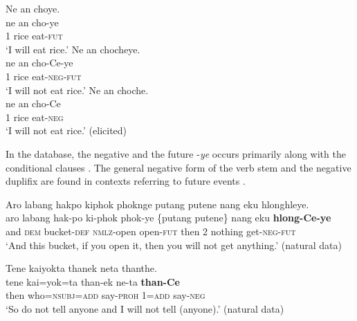 \documentclass[output=paper,colorlinks,citecolor=brown]{langscibook}
\begin{document}
\ea\label{ex:amr:3} 
    \ea\label{ex:amr:3a}Ne an choye.  \\
        \gll  ne an cho-ye \\
              1 rice eat-\textsc{fut} \\
        \glt ‘I will eat rice.’ 
    \ex\label{ex:amr:3b}Ne an chocheye. \\
        \gll  ne an cho-Ce-ye \\
              1 rice eat-\textsc{neg}{}-\textsc{fut} \\
        \glt ‘I will not eat rice.’ 
    \ex\label{ex:amr:3c} Ne an choche. \\
        \gll ne an cho-Ce\\
              1 rice eat-\textsc{neg} \\
        \glt ‘I will not eat rice.’ (elicited)
    \z
\z 

In the database, the negative and the future -\textit{ye} occurs primarily along with the conditional clauses . The general negative form of the verb stem and the negative duplifix are found in contexts referring to future events . 

{\ea\label{ex:amr:4} Aro labang hakpo kiphok phoknge putang putene nang eku hlonghleye. \\
    \gll aro labang hak-po ki-phok phok-ye \{putang putene\} nang eku \textbf{hlong-Ce-ye}\\
         and \textsc{dem} bucket-\textsc{def} \textsc{nmlz}{}-open open-\textsc{fut} then {} 2 nothing get-\textsc{neg}{}-\textsc{fut} \\
    \glt ‘And this bucket, if you open it, then you will not get anything.’ (natural data)
\z}

\ea\label{ex:amr:5} Tene kaiyokta thanek neta thanthe.\\
    \gll tene kai=yok=ta than-ek ne-ta \textbf{than-Ce} \\
          then who=\textsc{nsubj}=\textsc{add} say-\textsc{proh} 1=\textsc{add} say-\textsc{neg}\\
    \glt ‘So do not tell anyone and I will not tell (anyone).’ (natural data)
\z
\end{document}
